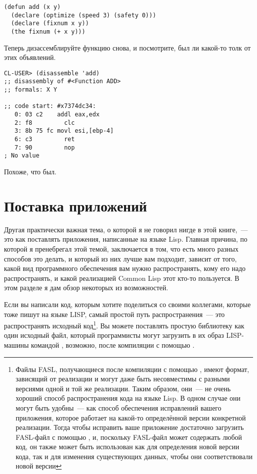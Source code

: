\begin{lstlisting}
(defun add (x y)
  (declare (optimize (speed 3) (safety 0)))
  (declare (fixnum x y))
  (the fixnum (+ x y)))
\end{lstlisting}

Теперь дизассемблируйте функцию  снова, и посмотрите, был ли какой-то толк от
этих объявлений.

\begin{lstlisting}
CL-USER> (disassemble 'add)
;; disassembly of #<Function ADD>
;; formals: X Y

;; code start: #x7374dc34:
   0: 03 c2    addl	eax,edx
   2: f8         clc
   3: 8b 75 fc movl	esi,[ebp-4]
   6: c3         ret
   7: 90         nop
; No value
\end{lstlisting}

Похоже, что был.

\section{Поставка приложений}

Другая практически важная тема, о которой я не говорил нигде в этой книге,~--- это как
поставлять приложения, написанные на языке Lisp. Главная причина, по которой я пренебрегал
этой темой, заключается в том, что есть много разных способов это делать, и который из них
лучше вам подходит, зависит от того, какой вид программного обеспечения вам нужно
распространять, кому его надо распространять, и какой реализацией Common Lisp этот кто-то
пользуется. В этом разделе я дам обзор некоторых из возможностей.

Если вы написали код, которым хотите поделиться со своими коллегами, которые тоже пишут на
языке LISP, самый простой путь распространения~--- это распространять исходный
код\footnote{Файлы FASL, получающиеся после компиляции с помощью ,
  имеют формат, зависящий от реализации и могут даже быть несовместимы с разными версиями
  одной и той же реализации. Таким образом, они~--- не очень хороший способ распространения
  кода на языке Lisp. В одном случае они могут быть удобны~--- как способ обеспечения
  исправлений вашего приложения, которое работает на какой-то определённой версии
  конкретной реализации. Тогда чтобы исправить ваше приложение достаточно загрузить
  FASL-файл с помощью , и, поскольку FASL-файл может содержать любой код, он
  также может быть использован как для определения новой версии кода, так и для изменения
  существующих данных, чтобы они соответствовали новой версии}. Вы можете поставлять
простую библиотеку как один исходный файл, который программисты могут загрузить в их образ
LISP-машины командой , возможно, после компиляции с помощью
.

